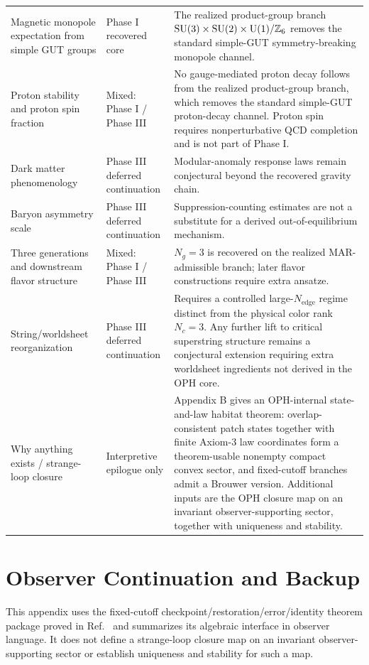 \begin{longtable}{p{} p{} p{}}
Magnetic monopole expectation from simple GUT groups & Phase I recovered core & The realized product-group branch \(\mathrm{SU}(3)\times\mathrm{SU}(2)\times\mathrm{U}(1)/\mathbb Z_6\) removes the standard simple-GUT symmetry-breaking monopole channel. \\
Proton stability and proton spin fraction & Mixed: Phase I / Phase III & No gauge-mediated proton decay follows from the realized product-group branch, which removes the standard simple-GUT proton-decay channel. Proton spin requires nonperturbative QCD completion and is not part of Phase I. \\
Dark matter phenomenology & Phase III deferred continuation & Modular-anomaly response laws remain conjectural beyond the recovered gravity chain. \\
Baryon asymmetry scale & Phase III deferred continuation & Suppression-counting estimates are not a substitute for a derived out-of-equilibrium mechanism. \\
Three generations and downstream flavor structure & Mixed: Phase I / Phase III & \(N_g=3\) is recovered on the realized MAR-admissible branch; later flavor constructions require extra ansatze. \\
String/worldsheet reorganization & Phase III deferred continuation & Requires a controlled large-\(N_{\mathrm{edge}}\) regime distinct from the physical color rank \(N_c=3\). Any further lift to critical superstring structure remains a conjectural extension requiring extra worldsheet ingredients not derived in the OPH core. \\
Why anything exists / strange-loop closure & Interpretive epilogue only & Appendix B gives an OPH-internal state-and-law habitat theorem: overlap-consistent patch states together with finite Axiom-3 law coordinates form a theorem-usable nonempty compact convex sector, and fixed-cutoff branches admit a Brouwer version. Additional inputs are the OPH closure map on an invariant observer-supporting sector, together with uniqueness and stability. \\
\end{longtable}

\section{Observer Continuation and Backup}

This appendix uses the fixed-cutoff checkpoint/restoration/error/identity theorem package proved
in Ref.~\cite{ophmicrophysics} and summarizes its algebraic interface in observer language. It
does not define a strange-loop closure map on an invariant observer-supporting sector or establish
uniqueness and stability for such a map.

